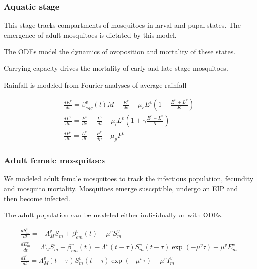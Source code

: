 \documentclass{bmcart}
\begin{document}
\subsubsection*{Aquatic stage}

This stage tracks compartments of mosquitoes in larval and pupal states. The emergence of adult mosquitoes is dictated by this model.

The ODEs model the dynamics of ovoposition and mortality of these states.

Carrying capacity drives the mortality of early and late stage mosquitoes.


Rainfall is modeled from Fourier analyses of average rainfall


\begin{gather*}
    \frac{dE^v}{dt} = \beta_{egg}^v(t) M - \frac{E^v}{de} - \mu_e E^v \left(1 + \frac{E^v + L^v}{K}\right) \\
    \frac{dL^v}{dt} = \frac{E^v}{de} - \frac{L^v}{dl} - \mu_l L^v \left(1 + \gamma \frac{E^v + L^v}{K}\right)  \\
    \frac{dP^v}{dt} = \frac{L^v}{dl} - \frac{P^v}{dp} - \mu_p P^v
\end{gather*}


\subsubsection*{Adult female mosquitoes}

We modeled adult female mosquitoes to track the infectious population, fecundity and mosquito mortality. Mosquitoes emerge susceptible, undergo an EIP and then become infected.

The adult population can be modeled either individually or with ODEs.

\begin{gather*}
    \frac{dS^v_m}{dt} = -\Lambda_M^v S_m + \beta_{em}^v(t) - \mu^v S^v_m \\
    \frac{dE^v_m}{dt} = \Lambda_M^v S^v_m + \beta_{em}^v(t) - \Lambda^v(t - \tau) S^v_m(t - \tau) \exp(-\mu^v\tau) - \mu^v E^v_m \\
    \frac{dI^v_m}{dt} = \Lambda_M^v(t - \tau) S^v_m(t - \tau) \exp(-\mu^v\tau) - \mu^v I^v_m
\end{gather*}
\end{document}
